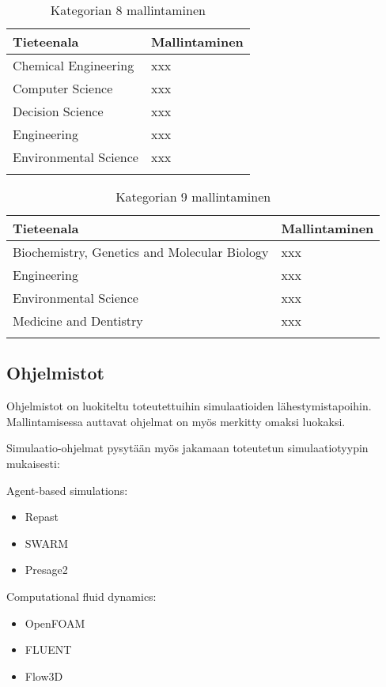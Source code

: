 \documentclass[utf8]{gradu3}
\begin{document}
\begin{longtable}[h]{|p{5cm}|p{8cm}|}
    \hline
    \textbf{Tieteenala}    &    \textbf{Mallintaminen}\\
    \hline
    Chemical Engineering & xxx \\
    \hline
    Computer Science & xxx \\
    \hline
    Decision Science & xxx \\
    \hline
    Engineering & xxx \\
    \hline
    Environmental Science & xxx \\
    \hline
    \caption{Kategorian 8 mallintaminen}
    \label{table:Kategorian 8 mallintaminen}
\end{longtable}

\begin{longtable}[h]{|p{5cm}|p{8cm}|}
    \hline
    \textbf{Tieteenala}    &    \textbf{Mallintaminen}\\
    \hline
    Biochemistry, Genetics and Molecular Biology & xxx \\
    \hline
    Engineering & xxx \\
    \hline
    Environmental Science & xxx \\
    \hline
    Medicine and Dentistry & xxx \\
    \hline
    \caption{Kategorian 9 mallintaminen}
    \label{table:Kategorian 9 mallintaminen}
\end{longtable}

\subsection{Ohjelmistot}
Ohjelmistot on luokiteltu toteutettuihin simulaatioiden lähestymistapoihin. Mallintamisessa auttavat ohjelmat on myös merkitty omaksi luokaksi.

Simulaatio-ohjelmat pysytään myös jakamaan toteutetun simulaatiotyypin mukaisesti:

Agent-based simulations:
\begin{itemize}[noitemsep, topsep=0pt]
    \item Repast
    \item SWARM
    \item Presage2
\end{itemize}

Computational fluid dynamics:
\begin{itemize}
    \item OpenFOAM
    \item FLUENT
    \item Flow3D
\end{itemize}
\end{document}
